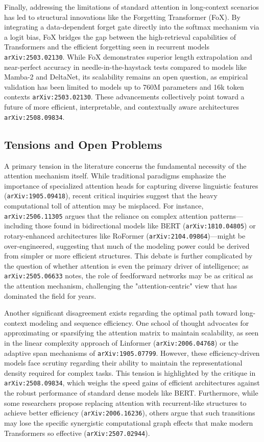 \documentclass[11pt]{article}
\begin{document}
Finally, addressing the limitations of standard attention in long-context scenarios has led to structural innovations like the Forgetting Transformer (FoX). By integrating a data-dependent forget gate directly into the softmax mechanism via a logit bias, FoX bridges the gap between the high-retrieval capabilities of Transformers and the efficient forgetting seen in recurrent models \texttt{arXiv:2503.02130}. While FoX demonstrates superior length extrapolation and near-perfect accuracy in needle-in-the-haystack tests compared to models like Mamba-2 and DeltaNet, its scalability remains an open question, as empirical validation has been limited to models up to 760M parameters and 16k token contexts \texttt{arXiv:2503.02130}. These advancements collectively point toward a future of more efficient, interpretable, and contextually aware architectures \texttt{arXiv:2508.09834}.

\subsection{Tensions and Open Problems}

A primary tension in the literature concerns the fundamental necessity of the attention mechanism itself. While traditional paradigms emphasize the importance of specialized attention heads for capturing diverse linguistic features (\texttt{arXiv:1905.09418}), recent critical inquiries suggest that the heavy computational toll of attention may be misplaced. For instance, \texttt{arXiv:2506.11305} argues that the reliance on complex attention patterns—including those found in bidirectional models like BERT (\texttt{arXiv:1810.04805}) or rotary-enhanced architectures like RoFormer (\texttt{arXiv:2104.09864})—might be over-engineered, suggesting that much of the modeling power could be derived from simpler or more efficient structures. This debate is further complicated by the question of whether attention is even the primary driver of intelligence; as \texttt{arXiv:2505.06633} notes, the role of feedforward networks may be as critical as the attention mechanism, challenging the "attention-centric" view that has dominated the field for years.

Another significant disagreement exists regarding the optimal path toward long-context modeling and sequence efficiency. One school of thought advocates for approximating or sparsifying the attention matrix to maintain scalability, as seen in the linear complexity approach of Linformer (\texttt{arXiv:2006.04768}) or the adaptive span mechanisms of \texttt{arXiv:1905.07799}. However, these efficiency-driven models face scrutiny regarding their ability to maintain the representational density required for complex tasks. This tension is highlighted by the critique in \texttt{arXiv:2508.09834}, which weighs the speed gains of efficient architectures against the robust performance of standard dense models like BERT. Furthermore, while some researchers propose replacing attention with recurrent-like structures to achieve better efficiency (\texttt{arXiv:2006.16236}), others argue that such transitions may lose the specific synergistic computational graph effects that make modern Transformers so effective (\texttt{arXiv:2507.02944}).
\end{document}
